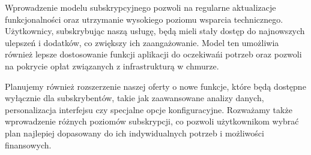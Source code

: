 Wprowadzenie modelu subskrypcyjnego pozwoli na regularne aktualizacje funkcjonalności oraz utrzymanie wysokiego poziomu wsparcia technicznego. Użytkownicy, subskrybując naszą usługę, będą mieli stały dostęp do najnowszych ulepszeń i dodatków, co zwiększy ich zaangażowanie. Model ten umożliwia również lepsze dostosowanie funkcji aplikacji do oczekiwań\linebreak i potrzeb oraz pozwoli na pokrycie opłat związanych z infrastrukturą w chmurze.

Planujemy również rozszerzenie naszej oferty o nowe funkcje, które będą dostępne wyłącznie dla subskrybentów, takie jak zaawansowane analizy danych, personalizacja interfejsu czy specjalne opcje konfiguracyjne. Rozważamy także wprowadzenie różnych poziomów subskrypcji, co pozwoli użytkownikom wybrać plan najlepiej dopasowany do ich indywidualnych potrzeb i możliwości finansowych.